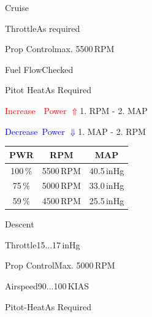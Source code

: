 \begin{checklist}{Cruise}
  \item{Throttle}{As required}
  \item{Prop Control}{max. 5500\,RPM}
  \item{Fuel Flow}{Checked}
  \item{Pitot Heat}{As Required}

  \item{\textcolor{red}{Increase~~Power $\Uparrow$}}{1. RPM - 2. MAP}
  \item{\textcolor{blue}{Decrease~Power $\Downarrow$}}{1. MAP - 2. RPM}
\end{checklist}

\begin{table}[!ht]
  \large
  \centering
  \begin{tabular}{|c|c|c|}
  \hline
  \cellcolor{black!90}\color{white}\textbf{PWR} & \cellcolor{black!90}\color{white}\textbf{RPM}  & \cellcolor{black!90}\color{white}\textbf{MAP} \\ \hline

  100\,\% & 5500\,RPM & 40.5\,inHg \\ \hline
  75\,\% & 5000\,RPM & 33.0\,inHg \\ \hline
  59\,\% & 4500\,RPM & 25.5\,inHg \\ \hline

  \end{tabular}
\end{table}


\begin{checklist}{Descent}
  \item{Throttle}{15...17\,inHg}
  \item{Prop Control}{Max. 5000\,RPM}
  \item{Airspeed}{90...100\,KIAS}
  \item{Pitot-Heat}{As Required}
\end{checklist}

